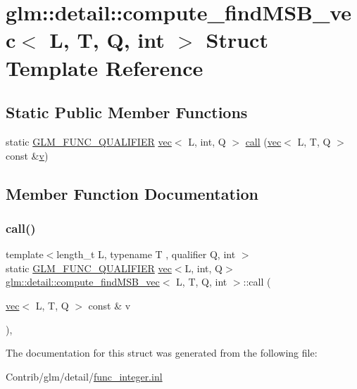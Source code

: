 \hypertarget{structglm_1_1detail_1_1compute__find_m_s_b__vec}{}\section{glm\+:\+:detail\+:\+:compute\+\_\+find\+M\+S\+B\+\_\+vec$<$ L, T, Q, int $>$ Struct Template Reference}
\label{structglm_1_1detail_1_1compute__find_m_s_b__vec}
\subsection*{Static Public Member Functions}
\begin{DoxyCompactItemize}
\item 
static \mbox{\hyperlink{setup_8hpp_a33fdea6f91c5f834105f7415e2a64407}{G\+L\+M\+\_\+\+F\+U\+N\+C\+\_\+\+Q\+U\+A\+L\+I\+F\+I\+ER}} \mbox{\hyperlink{structglm_1_1vec}{vec}}$<$ L, int, Q $>$ \mbox{\hyperlink{structglm_1_1detail_1_1compute__find_m_s_b__vec_ab74bbcc16dd3f900d14de395a4689dbb}{call}} (\mbox{\hyperlink{structglm_1_1vec}{vec}}$<$ L, T, Q $>$ const \&\mbox{\hyperlink{_s_d_l__opengl_8h_a10a82eabcb59d2fcd74acee063775f90}{v}})
\end{DoxyCompactItemize}


\subsection{Member Function Documentation}
\mbox{\label{structglm_1_1detail_1_1compute__find_m_s_b__vec_ab74bbcc16dd3f900d14de395a4689dbb}} 
\subsubsection{\texorpdfstring{call()}{call()}}
{\footnotesize\ttfamily template$<$length\+\_\+t L, typename T , qualifier Q, int $>$ \\
static \mbox{\hyperlink{setup_8hpp_a33fdea6f91c5f834105f7415e2a64407}{G\+L\+M\+\_\+\+F\+U\+N\+C\+\_\+\+Q\+U\+A\+L\+I\+F\+I\+ER}} \mbox{\hyperlink{structglm_1_1vec}{vec}}$<$L, int, Q$>$ \mbox{\hyperlink{structglm_1_1detail_1_1compute__find_m_s_b__vec}{glm\+::detail\+::compute\+\_\+find\+M\+S\+B\+\_\+vec}}$<$ L, T, Q, int $>$\+::call (\begin{DoxyParamCaption}\item[{\mbox{\hyperlink{structglm_1_1vec}{vec}}$<$ L, T, Q $>$ const \&}]{v }\end{DoxyParamCaption})\hspace{0.3cm}{\ttfamily [inline]}, {\ttfamily [static]}}



The documentation for this struct was generated from the following file\+:\begin{DoxyCompactItemize}
\item 
Contrib/glm/detail/\mbox{\hyperlink{func__integer_8inl}{func\+\_\+integer.\+inl}}\end{DoxyCompactItemize}
